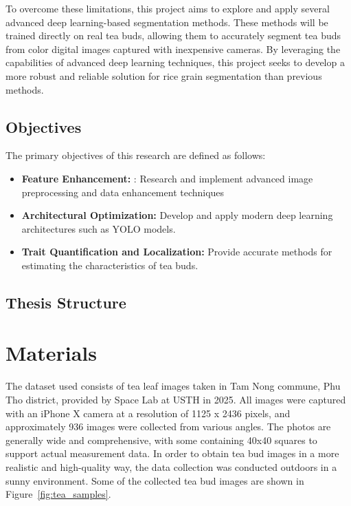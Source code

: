 \documentclass[a4paper,12pt]{report}
\begin{document}
To overcome these limitations, this project aims to explore and apply several advanced deep learning-based segmentation methods. These methods will be trained directly on real tea buds, allowing them to accurately segment tea buds from color digital images captured with inexpensive cameras. By leveraging the capabilities of advanced deep learning techniques, this project seeks to develop a more robust and reliable solution for rice grain segmentation than previous methods.











\section{Objectives}
The primary objectives of this research are defined as follows:

\begin{itemize}
    \item \textbf{Feature Enhancement:} : Research and implement advanced image preprocessing and data enhancement techniques
    
    \item \textbf{Architectural Optimization:} Develop and apply modern deep learning architectures such as YOLO models.
    
    \item \textbf{Trait Quantification and Localization:} Provide accurate methods for estimating the characteristics of tea buds.
\end{itemize}





\section{Thesis Structure}

\chapter{Materials}
The dataset used consists of tea leaf images taken in Tam Nong commune, Phu Tho district, provided by Space Lab at USTH in 2025. All images were captured with an iPhone X camera at a resolution of 1125 x 2436 pixels, and approximately 936 images were collected from various angles.  The photos are generally wide and comprehensive, with some containing 40x40 squares to support actual measurement data.
In order to obtain tea bud images in a more realistic and high-quality way,
the data collection was conducted outdoors in a sunny environment. Some of the collected tea bud images are shown
in Figure~\ref{fig:tea_samples}. 
\end{document}
